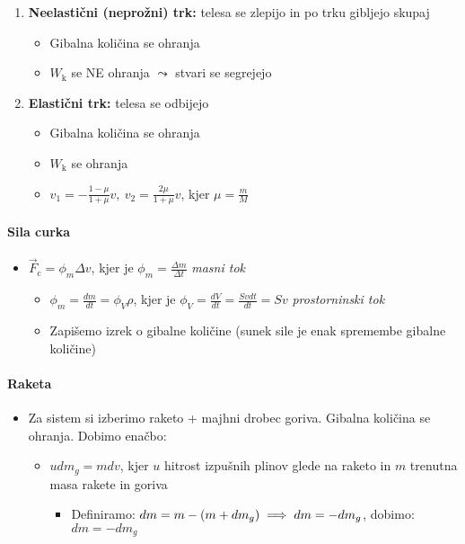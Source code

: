 \begin{enumerate}
    \item \textbf{Neelastični (neprožni) trk:} telesa se zlepijo in po trku gibljejo skupaj
    \begin{itemize}
        \item Gibalna količina se ohranja
        \item \(W_\text{k}\) se NE ohranja \(\leadsto\) stvari se segrejejo 
    \end{itemize}
    \item \textbf{Elastični trk:} telesa se odbijejo
    \begin{itemize}
        \item Gibalna količina se ohranja
        \item \(W_\text{k}\) se ohranja
        \item \(\boxed{v_1 = - \frac{1 - \mu}{1 + \mu} v, \ v_2 = \frac{2 \mu}{1 + \mu} v}\), kjer \(\mu = \frac{m}{M}\)
    \end{itemize}
\end{enumerate}

\paragraph{Sila curka}
\begin{itemize}
    \item \(\vec{F}_\text{c} = \phi_m \Delta v\), kjer je \(\phi_m = \frac{\Delta m}{\Delta t}\) \emph{masni tok}
    \begin{itemize}
        \item \(\phi_m = \frac{dm}{dt} = \phi_V \rho\), kjer je \(\phi_V = \frac{dV}{dt} = \frac{Svdt}{dt} = Sv\) \emph{prostorninski tok}
        \item Zapišemo izrek o gibalne količine (sunek sile je enak spremembe gibalne količine)
    \end{itemize}
\end{itemize}

\paragraph{Raketa} 
\begin{itemize}
    \item Za sistem si izberimo raketo + majhni drobec goriva. Gibalna količina se ohranja. Dobimo enačbo:
    \begin{itemize}
        \item \(u dm_g = mdv\), kjer \(u\) hitrost izpušnih plinov glede na raketo in \(m\) trenutna masa rakete in goriva
        \begin{itemize}
            \item Definiramo: \(dm = m - (m + dm_g) \implies dm = -dm_g\), dobimo: \(dm = -dm_g\)
        \end{itemize}
    \end{itemize}
\end{itemize}


